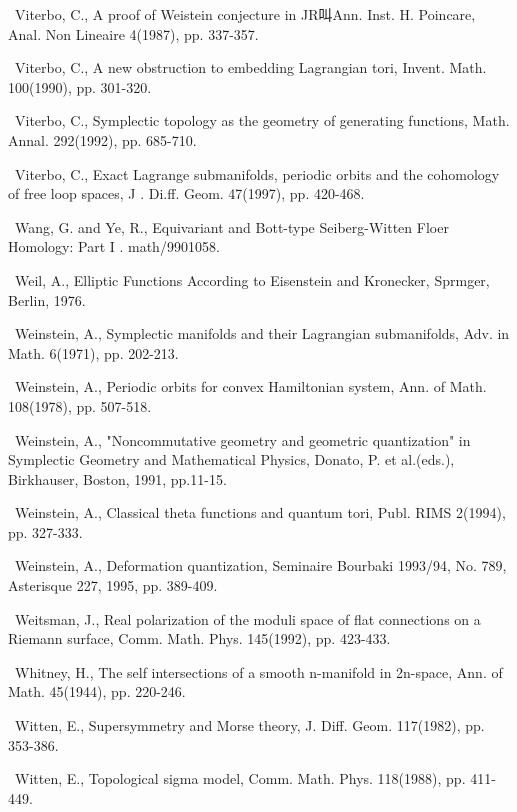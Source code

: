 {\noindent [378]\ Viterbo, C., A proof of Weistein conjecture in JR叫Ann. Inst. H. Poincare, Anal. Non Lineaire 4(1987), pp. 337-357.\par\smallskip
\noindent [379]\ Viterbo, C., A new obstruction to embedding Lagrangian tori, Invent. Math. 100(1990), pp. 301-320.\par\smallskip
\noindent [380]\ Viterbo, C., Symplectic topology as the geometry of generating functions, Math. Annal. 292(1992), pp. 685-710.\par\smallskip
\noindent [381]\ Viterbo, C., Exact Lagrange submanifolds, periodic orbits and the cohomology of free loop spaces, J . Di.ff. Geom. 47(1997), pp. 420-468.\par\smallskip
\noindent [382]\ Wang, G. and Ye, R., Equivariant and Bott-type Seiberg-Witten Floer Homology: Part I . math/9901058.\par\smallskip
\noindent [383]\ Weil, A., Elliptic Functions According to Eisenstein and Kronecker, Sprmger, Berlin, 1976.\par\smallskip
\noindent [384]\ Weinstein, A., Symplectic manifolds and their Lagrangian submanifolds, Adv. in Math. 6(1971), pp. 202-213.\par\smallskip
\noindent [385]\ Weinstein, A., Periodic orbits for convex Hamiltonian system, Ann. of Math. 108(1978), pp. 507-518.\par\smallskip
\noindent [386]\ Weinstein, A., "Noncommutative geometry and geometric quantization" in Symplectic Geometry and Mathematical Physics, Donato, P. et al.(eds.), Birkhauser, Boston, 1991, pp.11-15.\par\smallskip
\noindent [387]\ Weinstein, A., Classical theta functions and quantum tori, Publ. RIMS 2(1994), pp. 327-333.\par\smallskip
\noindent [388]\ Weinstein, A., Deformation quantization, Seminaire Bourbaki 1993/94, No. 789, Asterisque 227, 1995, pp. 389-409.\par\smallskip
\noindent [389]\ Weitsman, J., Real polarization of the moduli space of flat connections on a Riemann surface, Comm. Math. Phys. 145(1992), pp. 423-433.\par\smallskip
\noindent [390]\ Whitney, H., The self intersections of a smooth n-manifold in 2n-space, Ann. of Math. 45(1944), pp. 220-246.\par\smallskip
\noindent [391]\ Witten, E., Supersymmetry and Morse theory, J. Diff. Geom. 117(1982), pp. 353-386.\par\smallskip
\noindent [392]\ Witten, E., Topological sigma model, Comm. Math. Phys. 118(1988), pp. 411-449.\par\smallskip
}
